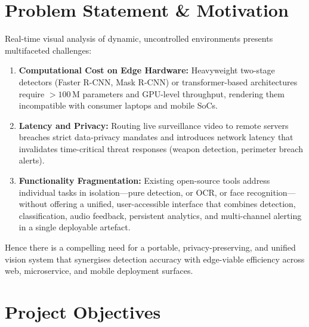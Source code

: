 \documentclass[conference]{IEEEtran}
\begin{document}
\section{Problem Statement \& Motivation}

Real-time visual analysis of dynamic, uncontrolled environments presents
multifaceted challenges:

\begin{enumerate}
    \item \textbf{Computational Cost on Edge Hardware:} Heavyweight two-stage
          detectors (Faster R-CNN, Mask R-CNN) or transformer-based architectures
          require $>\!100\,\text{M}$ parameters and GPU-level throughput,
          rendering them incompatible with consumer laptops and mobile SoCs.

    \item \textbf{Latency and Privacy:} Routing live surveillance video to
          remote servers breaches strict data-privacy mandates and introduces
          network latency that invalidates time-critical threat responses
          (weapon detection, perimeter breach alerts).

    \item \textbf{Functionality Fragmentation:} Existing open-source tools
          address individual tasks in isolation—pure detection, or OCR, or
          face recognition—without offering a unified, user-accessible interface
          that combines detection, classification, audio feedback, persistent
          analytics, and multi-channel alerting in a single deployable artefact.
\end{enumerate}

Hence there is a compelling need for a portable, privacy-preserving, and
unified vision system that synergises detection accuracy with edge-viable
efficiency across web, microservice, and mobile deployment surfaces.

\section{Project Objectives}
\end{document}

